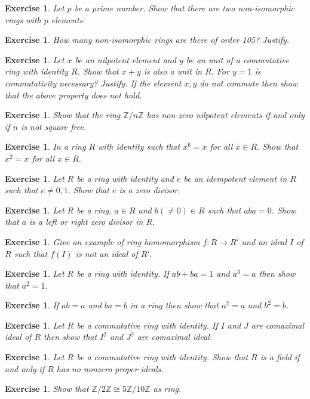 \documentclass[11pt]{amsart}
\newtheorem{ex}[theorem]{Exercise}
\newcommand{\ZZ}{\mathbb Z}
\begin{document}
\begin{ex}
Let $p$ be a prime number. Show that there are two non-isomorphic rings with $p$ elements.
\end{ex}
\begin{ex}
How many non-isomorphic rings are there of order 105? Justify.
\end{ex}
\begin{ex}
Let $x$ be an nilpotent element and $y$ be an unit of a commutative ring with identity $R.$ Show that $x+y$ is also a unit in $R.$ For $y=1$ is commutativity necessary? Justify. If the element $x,y$ do not commute then show that the above property does not hold.
\end{ex}
\begin{ex}
Show that the ring ${\ZZ}/n{\ZZ}$ has non-zero nilpotent elements if and only if $n$ is not square free.
\end{ex}
\begin{ex}
In a ring $R$ with identity such that $x^6=x$ for all $x\in R.$ Show that $x^2=x$ for all $x\in R.$
\end{ex}
\begin{ex}
Let $R$ be a ring with identity and $e$ be an idempotent element in $R$ such that $e\neq 0,1.$ Show that $e$ is a zero divisor.
\end{ex}
\begin{ex}
Let $R$ be a ring, $a\in R$ and $b(\neq 0)\in R$ such that $aba=0$. Show that $a$ is a left or right zero divisor in $R.$
\end{ex}
\begin{ex}
Give an example of ring homomorphism $f:R\to R'$ and an ideal $I$ of $R$ such that $f(I)$ is not an ideal of $R'.$
\end{ex}
\begin{ex}
Let $R$ be a ring with identity. If $ab+ba=1$ and $a^3=a$ then show that $a^2=1.$ 
\end{ex}
\begin{ex}
If $ab=a$ and $ba=b$ in a ring then show that $a^2=a$ and $b^2=b$.
\end{ex}
\begin{ex}
Let $R$ be a commutative ring with identity. If $I$ and $J$ are comaximal ideal of $R$ then show that $I^2$ and $J^2$ are comaximal ideal.
\end{ex}
\begin{ex}
Let $R$ be a commutative ring with identity. Show that $R$ is a field if and only if $R$ has no nonzero proper ideals.
\end{ex}
\begin{ex}
Show that ${\ZZ}/2{\ZZ}\cong 5{\ZZ}/10{\ZZ}$ as ring.
\end{ex}
\end{document}
